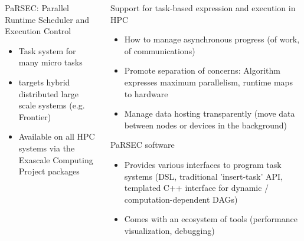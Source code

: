 \begin{frame}
\begin{columns}
\begin{column}{.4\textwidth}
\begin{minipage}{\linewidth}
\begin{center}
          \scriptsize PaRSEC: Parallel Runtime Scheduler and Execution Control
        \end{center}
        \begin{itemize}\scriptsize
        \item Task system for many micro tasks
        \item targets hybrid distributed large scale systems (e.g. Frontier)
        \item Available on all HPC systems via the Exascale Computing Project packages
        \end{itemize}
      \end{minipage}
    \end{column}\begin{column}{.7\linewidth}
      Support for task-based expression and execution in HPC
      \begin{itemize}
      \item How to manage asynchronous progress (of work, of communications)
      \item Promote separation of concerns: Algorithm expresses maximum parallelism, runtime maps to hardware
      \item Manage data hosting transparently (move data between nodes or devices in the background)
      \end{itemize}

      \bigskip

      \scriptsize PaRSEC software
      \begin{itemize}
      \item Provides various interfaces to program task systems (DSL, traditional 'insert-task' API, templated C++ interface for dynamic / computation-dependent DAGs)
      \item Comes with an ecosystem of tools (performance visualization, debugging)
      \end{itemize}
    \end{column}
  \end{columns}
  
\end{frame}

